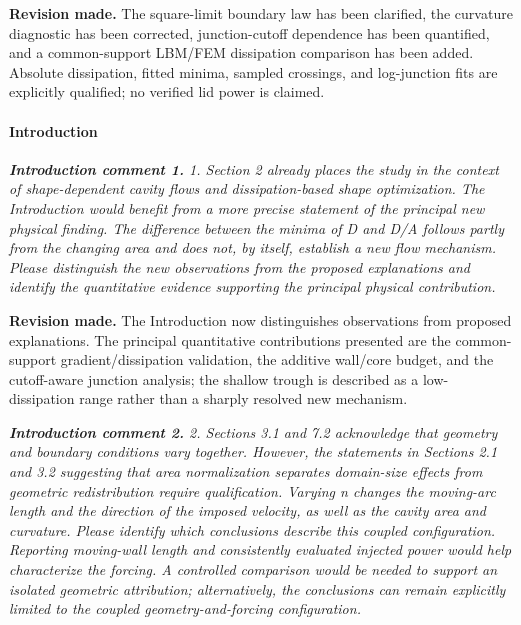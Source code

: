 \documentclass[11pt,a4paper]{article}
\newcommand{\qcomment}[1]{\textcolor{deepblue}{\itshape #1}}
\newcommand{\revwork}[1]{\textbf{\textcolor{revgreen}{#1}}}
\begin{document}
\noindent\revwork{Revision made.} The square-limit boundary law has been clarified, the curvature diagnostic has been corrected, junction-cutoff dependence has been quantified, and a common-support LBM/FEM dissipation comparison has been added. Absolute dissipation, fitted minima, sampled crossings, and log-junction fits are explicitly qualified; no verified lid power is claimed.

\medskip
\paragraph{Introduction}

\medskip
\noindent\qcomment{\textbf{Introduction comment 1.} 1. Section 2 already places the study in the context of shape-dependent cavity flows and dissipation-based shape optimization. The Introduction would benefit from a more precise statement of the principal new physical finding. The difference between the minima of D and D/A follows partly from the changing area and does not, by itself, establish a new flow mechanism. Please distinguish the new observations from the proposed explanations and identify the quantitative evidence supporting the principal physical contribution.}

\noindent\revwork{Revision made.} The Introduction now distinguishes observations from proposed explanations. The principal quantitative contributions presented are the common-support gradient/dissipation validation, the additive wall/core budget, and the cutoff-aware junction analysis; the shallow trough is described as a low-dissipation range rather than a sharply resolved new mechanism.

\medskip
\noindent\qcomment{\textbf{Introduction comment 2.} 2. Sections 3.1 and 7.2 acknowledge that geometry and boundary conditions vary together. However, the statements in Sections 2.1 and 3.2 suggesting that area normalization separates domain-size effects from geometric redistribution require qualification. Varying n changes the moving-arc length and the direction of the imposed velocity, as well as the cavity area and curvature. Please identify which conclusions describe this coupled configuration. Reporting moving-wall length and consistently evaluated injected power would help characterize the forcing. A controlled comparison would be needed to support an isolated geometric attribution; alternatively, the conclusions can remain explicitly limited to the coupled geometry-and-forcing configuration.}
\end{document}
